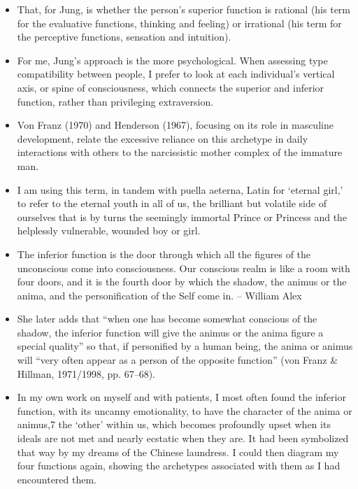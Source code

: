 \begin{itemize}
\item That, for Jung, is whether the person’s superior function is rational
(his term for the evaluative functions, thinking and feeling) or irrational
(his term for the perceptive functions, sensation and intuition).

\item For me, Jung’s approach is the more psychological. When assessing type
compatibility between people, I prefer to look at each individual’s vertical
axis, or spine of consciousness, which connects the superior and inferior
function, rather than privileging extraversion.

\item Von Franz (1970) and Henderson (1967), focusing on its role in masculine
development, relate the excessive reliance on this archetype in daily
interactions with others to the narcissistic mother complex of the immature
man.

\item I am using this term, in tandem with puella aeterna, Latin for ‘eternal
girl,’ to refer to the eternal youth in all of us, the brilliant but volatile
side of ourselves that is by turns the seemingly immortal Prince or Princess
and the helplessly vulnerable, wounded boy or girl.

\item The inferior function is the door through which all the figures of the
unconscious come into consciousness. Our conscious realm is like a room with
four doors, and it is the fourth door by which the shadow, the animus or the
anima, and the personification of the Self come in. -- William Alex

\item She later adds that “when one has become somewhat conscious of the
shadow, the inferior function will give the animus or the anima figure a
special quality” so that, if personified by a human being, the anima or animus
will “very often appear as a person of the opposite function” (von Franz \&
Hillman, 1971/1998, pp. 67–68).

\item In my own work on myself and with patients, I most often found the
inferior function, with its uncanny emotionality, to have the character of the
anima or animus,7 the ‘other’ within us, which becomes profoundly upset when
its ideals are not met and nearly ecstatic when they are. It had been
symbolized that way by my dreams of the Chinese laundress. I could then diagram
my four functions again, showing the archetypes associated with them as I had
encountered them.


\end{itemize}
